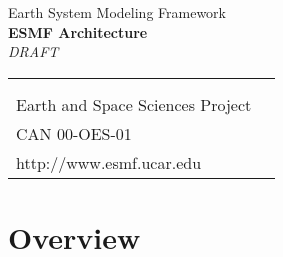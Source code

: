 \documentclass[]{article}
\begin{document}

\begin{titlepage}

\begin{center}
{\Large Earth System Modeling Framework } \\
\vspace{.25in}
{\Large {\bf ESMF Architecture}} \\
\vspace{.25in}
{\large {\it DRAFT}}
\vspace{.5in}
\end{center}

\begin{latexonly}
\vspace{5.5in}
\begin{tabular}{p{5in}p{.9in}}
\hrulefill \\
\noindent {\bf NASA High Performance Computing and Communications Program} \\
\noindent Earth and Space Sciences Project \\
\noindent CAN 00-OES-01 \\
\noindent http://www.esmf.ucar.edu \\
\end{tabular}
\end{latexonly}

\end{titlepage}

\tableofcontents

\newpage
%

\newpage
\begin{htmlonly}
\end{htmlonly}
\part{Overview}
\label{part:Overview}






\end{document}
